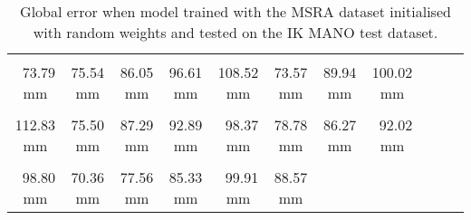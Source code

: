 \begin{table}[!ht]
    \begin{tabular}{|c|c|c|c|c|c|c|c|c|c|c|}
    \hline
    \cellcolor[HTML]{ff7500}{\bfseries Wrist} & \cellcolor[HTML]{ff7500}{\bfseries IMCP} & \cellcolor[HTML]{ff2500}{\bfseries IPIP} & \cellcolor[HTML]{ff0000}{\bfseries IDIP} & \cellcolor[HTML]{ff0000}{\bfseries ITIP} & \cellcolor[HTML]{ff7500}{\bfseries MMCP} & \cellcolor[HTML]{ff2500}{\bfseries MPIP} & \cellcolor[HTML]{ff0000}{\bfseries MDIP}  \\
    \cellcolor[HTML]{ff7500}$\,\,\,$73.79 mm & \cellcolor[HTML]{ff7500}$\,\,\,$75.54 mm & \cellcolor[HTML]{ff2500}$\,\,\,$86.05 mm & \cellcolor[HTML]{ff0000}$\,\,\,$96.61 mm & \cellcolor[HTML]{ff0000}108.52 mm & \cellcolor[HTML]{ff7500}$\,\,\,$73.57 mm & \cellcolor[HTML]{ff2500}$\,\,\,$89.94 mm & \cellcolor[HTML]{ff0000}100.02 mm\\
    \hline
    \cellcolor[HTML]{ff0000}{\bfseries MTIP} & \cellcolor[HTML]{ff7500}{\bfseries RMCP} & \cellcolor[HTML]{ff2500}{\bfseries RPIP} & \cellcolor[HTML]{ff0000}{\bfseries RDIP} & \cellcolor[HTML]{ff0000}{\bfseries RTIP} & \cellcolor[HTML]{ff7500}{\bfseries PMCP} & \cellcolor[HTML]{ff2500}{\bfseries PPIP} & \cellcolor[HTML]{ff0000}{\bfseries PDIP}  \\
    \cellcolor[HTML]{ff0000}112.83 mm & \cellcolor[HTML]{ff7500}$\,\,\,$75.50 mm & \cellcolor[HTML]{ff2500}$\,\,\,$87.29 mm & \cellcolor[HTML]{ff0000}$\,\,\,$92.89 mm & \cellcolor[HTML]{ff0000}$\,\,\,$98.37 mm & \cellcolor[HTML]{ff7500}$\,\,\,$78.78 mm & \cellcolor[HTML]{ff2500}$\,\,\,$86.27 mm & \cellcolor[HTML]{ff0000}$\,\,\,$92.02 mm\\
    \hline
    \cellcolor[HTML]{ff0000}{\bfseries PTIP} & \cellcolor[HTML]{ff7500}{\bfseries TMCP} & \cellcolor[HTML]{ff7500}{\bfseries TPIP} & \cellcolor[HTML]{ff2500}{\bfseries PDIP} & \cellcolor[HTML]{ff0000}{\bfseries TTIP} & \cellcolor[HTML]{ff2500}{\bfseries Average}  \\
    \cellcolor[HTML]{ff0000}$\,\,\,$98.80 mm & \cellcolor[HTML]{ff7500}$\,\,\,$70.36 mm & \cellcolor[HTML]{ff7500}$\,\,\,$77.56 mm & \cellcolor[HTML]{ff2500}$\,\,\,$85.33 mm & \cellcolor[HTML]{ff0000}$\,\,\,$99.91 mm & \cellcolor[HTML]{ff2500}$\,\,\,$88.57 mm \\
    \cline{1-6}
    \end{tabular}
    \caption{Global error when model trained with the MSRA dataset initialised with random weights and tested on the IK MANO test dataset.}
    \label{tb:baseline_maya:g}
    \end{table}
